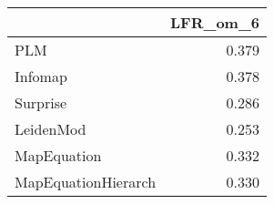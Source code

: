 \begin{tabular}{lr}
\toprule
{} & LFR_om_6 \\
\midrule
PLM                 &    0.379 \\
Infomap             &    0.378 \\
Surprise            &    0.286 \\
LeidenMod           &    0.253 \\
MapEquation         &    0.332 \\
MapEquationHierarch &    0.330 \\
\bottomrule
\end{tabular}
